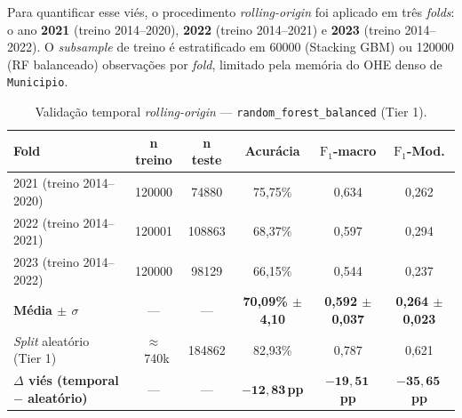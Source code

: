 Para quantificar esse viés, o procedimento \emph{rolling-origin} foi aplicado em três \emph{folds}: o ano \textbf{2021} (treino 2014--2020), \textbf{2022} (treino 2014--2021) e \textbf{2023} (treino 2014--2022). O \emph{subsample} de treino é estratificado em \num{60000} (Stacking GBM) ou \num{120000} (RF balanceado) observações por \emph{fold}, limitado pela memória do OHE denso de \texttt{Municipio}.

\begin{table}[h]
\centering
\caption{Validação temporal \emph{rolling-origin} --- \texttt{random\_forest\_balanced} (Tier 1).}
\label{tab:res_temporal_rf}
\small
\begin{tabular}{lccccc}
\toprule
\textbf{Fold} & \textbf{n treino} & \textbf{n teste} & \textbf{Acurácia} & \textbf{$\text{F}_1$-macro} & \textbf{$\text{F}_1$-Mod.} \\
\midrule
2021 (treino 2014--2020) & \num{120000}  & \num{74880}  & 75,75\% & 0,634 & 0,262 \\
2022 (treino 2014--2021) & \num{120001}  & \num{108863} & 68,37\% & 0,597 & 0,294 \\
2023 (treino 2014--2022) & \num{120000}  & \num{98129}  & 66,15\% & 0,544 & 0,237 \\
\textbf{Média $\pm$ $\sigma$} & --- & --- & \textbf{70,09\% $\pm$ 4,10} & \textbf{0,592 $\pm$ 0,037} & \textbf{0,264 $\pm$ 0,023} \\
\midrule
\emph{Split} aleatório (Tier 1) & $\approx$~740k & \num{184862} & 82,93\% & 0,787 & 0,621 \\
\textbf{$\Delta$ viés (temporal $-$ aleatório)} & --- & --- & $\boldsymbol{-12{,}83}$\,\textbf{pp} & $\boldsymbol{-19{,}51}$\,\textbf{pp} & $\boldsymbol{-35{,}65}$\,\textbf{pp} \\
\bottomrule
\end{tabular}
\end{table}

